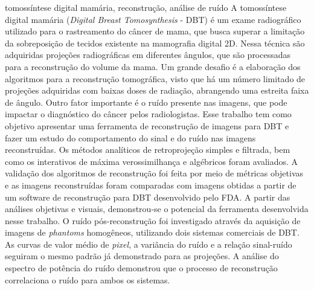 \documentclass[dissertmst]{eesc}
\begin{document}
\begin{resumo}{tomossíntese digital mamária, reconstrução, análise de ruído}
A tomossíntese digital mamária (\textit{Digital Breast Tomosynthesis} - \acs{DBT}) é um exame radiográfico utilizado para o rastreamento do câncer de mama, que busca superar a limitação da sobreposição de tecidos existente na mamografia digital \acs{2D}. Nessa técnica são adquiridas projeções radiográficas em diferentes ângulos, que são processadas para a reconstrução do volume da mama. Um grande desafio é a elaboração dos algoritmos para a reconstrução tomográfica, visto que há um número limitado de projeções adquiridas com baixas doses de radiação, abrangendo uma estreita faixa de ângulo. Outro fator importante é o ruído presente nas imagens, que pode impactar o diagnóstico do câncer pelos radiologistas. Esse trabalho tem como objetivo apresentar uma ferramenta de reconstrução de imagens para \acs{DBT} e fazer um estudo do comportamento do sinal e do ruído nas imagens reconstruídas. Os métodos analíticos de retroprojeção simples e  filtrada, bem como os interativos de máxima verossimilhança e algébricos foram avaliados. A validação dos algoritmos de reconstrução foi feita por meio de métricas objetivas e as imagens reconstruídas foram comparadas com imagens obtidas a partir de um software de reconstrução para \acs{DBT} desenvolvido pelo \ac{FDA}. A partir das análises objetivas e visuais, demonstrou-se o potencial da ferramenta desenvolvida nesse trabalho. O ruído pós-reconstrução foi investigado através da aquisição de imagens de \textit{phantoms} homogêneos, utilizando dois sistemas comerciais de \acs{DBT}. As curvas de valor médio de \textit{pixel}, a variância do ruído e a relação sinal-ruído seguiram o mesmo padrão já demonstrado para as projeções. A análise do espectro de potência do ruído demonstrou que o processo de reconstrução correlaciona o ruído para ambos os sistemas.

\end{resumo}
\end{document}
